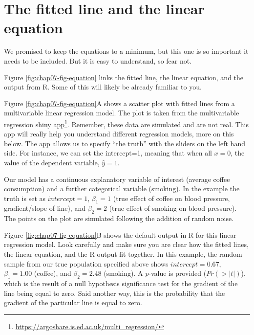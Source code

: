 \documentclass[12pt,]{krantz}
\renewcommand{\href}[2]{#2\footnote{\url{#1}}}
\theoremstyle{definition}
\theoremstyle{definition}
\theoremstyle{definition}
\theoremstyle{remark}
\begin{document}
\hypertarget{the-fitted-line-and-the-linear-equation}{%
\section{The fitted line and the linear
equation}\label{the-fitted-line-and-the-linear-equation}}

We promised to keep the equations to a minimum, but this one is so
important it needs to be included. But it is easy to understand, so fear
not.

Figure \ref{fig:chap07-fig-equation} links the fitted line, the linear
equation, and the output from R. Some of this will likely be already
familiar to you.

Figure \ref{fig:chap07-fig-equation}A shows a scatter plot with fitted
lines from a multivariable linear regression model. The plot is taken
from the
\href{https://argoshare.is.ed.ac.uk/multi_regression/}{multivariable
regression shiny app}. Remember, these data are simulated and are not
real. This app will really help you understand different regression
models, more on this below. The app allows us to specify ``the truth''
with the sliders on the left hand side. For instance, we can set the
intercept=1, meaning that when all \(x=0\), the value of the dependent
variable, \(\hat{y}=1\).

Our model has a continuous explanatory variable of interest (average
coffee consumption) and a further categorical variable (smoking). In the
example the truth is set as \(intercept=1\), \(\beta_1=1\) (true effect
of coffee on blood pressure, gradient/slope of line), and \(\beta_2=2\)
(true effect of smoking on blood pressure). The points on the plot are
simulated following the addition of random noise.

Figure \ref{fig:chap07-fig-equation}B shows the default output in R for
this linear regression model. Look carefully and make sure you are clear
how the fitted lines, the linear equation, and the R output fit
together. In this example, the random sample from our true population
specified above shows \(intercept=0.67\), \(\beta_1=1.00\) (coffee), and
\(\beta_2=2.48\) (smoking). A \emph{p}-value is provided
(\(Pr(> \left| t \right|)\)), which is the result of a null hypothesis
significance test for the gradient of the line being equal to zero. Said
another way, this is the probability that the gradient of the particular
line is equal to zero.
\end{document}
